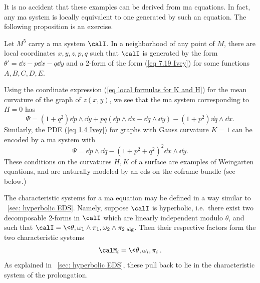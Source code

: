 It is no accident that these examples can be derived from \gls{ma} equations. In fact, any \gls{ma} system is locally equivalent to one generated by such an equation. The following proposition is an exercise.

\begin{prop}
    Let $M^5$ carry a \gls{ma} system $\calI$. In a neighborhood of any point of $M$, there are local coordinates $x,y,z,p,q$ such that $\calI$ is generated by the form $\theta'=\dd z-p\dd x-q\dd y$ and a $2$-form of the form (\ref{eq 7.19 Ivey}) for some functions $A,B,C,D,E$.
\end{prop}

\begin{example}\label{ex minimal surface EDS}
    Using the coordinate expression (\ref{eq local formulas for K and H}) for the mean curvature of the graph of $z(x,y)$, we see that the \gls{ma} system corresponding to $H=0$ has 
    \[\Psi=(1+q^2)\dd p\wedge \dd y+pq(\dd p\wedge \dd x-\dd q\wedge \dd y)-(1+p^2)\dd q\wedge \dd x.\]
    Similarly, the PDE (\ref{eq 1.4 Ivey}) for graphs with Gauss curvature $K=1$ can be encoded by a \gls{ma} system with 
    \[\Psi=\dd p\wedge \dd q-(1+p^2+q^2)^2\dd x\wedge \dd y.\]
    These conditions on the curvatures $H,K$ of a surface are examples of Weingarten equations, and are naturally modeled by an \gls{eds} on the coframe bundle (see below.)
\end{example}

The characteristic systems for a \gls{ma} equation may be defined in a way similar to \subsect~\ref{sec: hyperbolic EDS}. Namely, suppose $\calI$ is hyperbolic, i.e.\ there exist two decomposable $2$-forms in $\calI$ which are linearly independent modulo $\theta$, and such that $\calI=\<\theta,\omega_1\wedge\pi_1,\omega_2\wedge\pi_2\>_{\mathrm{alg}}$. Then their respective factors form the two characteristic systems 
\[\calM_i=\<\theta,\omega_i,\pi_i\>.\]
As explained in  \subsect~\ref{sec: hyperbolic EDS}, these pull back to lie in the characteristic system of the prolongation.


